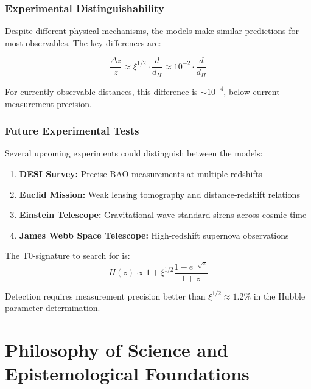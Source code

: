 \documentclass[12pt,a4paper]{article}
\theoremstyle{definition}
\begin{document}
\subsubsection{Experimental Distinguishability}

Despite different physical mechanisms, the models make similar predictions for most observables. The key differences are:

\begin{equation}
	\frac{\Delta z}{z} \approx \xi^{1/2} \cdot \frac{d}{d_H} \approx 10^{-2} \cdot \frac{d}{d_H}
\end{equation}

For currently observable distances, this difference is $\sim 10^{-4}$, below current measurement precision.

\subsubsection{Future Experimental Tests}

Several upcoming experiments could distinguish between the models:

\begin{enumerate}
	\item \textbf{DESI Survey:} Precise BAO measurements at multiple redshifts
	\item \textbf{Euclid Mission:} Weak lensing tomography and distance-redshift relations
	\item \textbf{Einstein Telescope:} Gravitational wave standard sirens across cosmic time
	\item \textbf{James Webb Space Telescope:} High-redshift supernova observations
\end{enumerate}

The T0-signature to search for is:
\begin{equation}
	H(z) \propto 1 + \xi^{1/2} \frac{1 - e^{-\sqrt{z}}}{1 + z}
\end{equation}

Detection requires measurement precision better than $\xi^{1/2} \approx 1.2\%$ in the Hubble parameter determination.	
	
	\section{Philosophy of Science and Epistemological Foundations}
	
\end{document}

